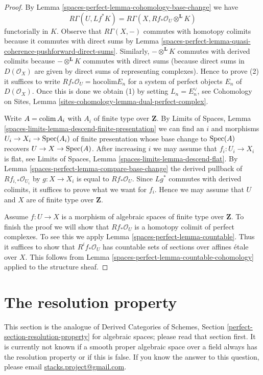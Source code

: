 \begin{proof}
By Lemma \ref{spaces-perfect-lemma-cohomology-base-change} we have
$$
R\Gamma(U, Lf^*K) = R\Gamma(X, Rf_*\mathcal{O}_U \otimes^\mathbf{L} K)
$$
functorially in $K$. Observe that $R\Gamma(X, -)$ commutes with
homotopy colimits because it commutes with direct sums by
Lemma \ref{spaces-perfect-lemma-quasi-coherence-pushforward-direct-sums}.
Similarly, $- \otimes^\mathbf{L} K$ commutes with derived colimits
because $- \otimes^\mathbf{L} K$ commutes with direct sums
(because direct sums in $D(\mathcal{O}_X)$
are given by direct sums of representing complexes).
Hence to prove (2) it suffices to write
$Rf_*\mathcal{O}_U = \text{hocolim} E_n$ for a system of
perfect objects $E_n$ of $D(\mathcal{O}_X)$. Once this is done
we obtain (1) by setting $L_n = E_n^\vee$, see Cohomology on Sites,
Lemma \ref{sites-cohomology-lemma-dual-perfect-complex}.

\medskip\noindent
Write $A = \operatorname{colim} A_i$ with $A_i$ of finite type over $\mathbf{Z}$. By
Limits of Spaces, Lemma \ref{spaces-limits-lemma-descend-finite-presentation}
we can find an $i$ and morphisms $U_i \to X_i \to \operatorname{Spec}(A_i)$
of finite presentation whose base change to $\operatorname{Spec}(A)$ recovers
$U \to X \to \operatorname{Spec}(A)$.
After increasing $i$ we may assume that $f_i : U_i \to X_i$ is
flat, see Limits of Spaces, Lemma
\ref{spaces-limits-lemma-descend-flat}.
By Lemma \ref{spaces-perfect-lemma-compare-base-change}
the derived pullback of $Rf_{i, *}\mathcal{O}_{U_i}$
by $g : X \to X_i$ is equal to $Rf_*\mathcal{O}_U$.
Since $Lg^*$ commutes with derived colimits, it suffices
to prove what we want for $f_i$. Hence we may assume that
$U$ and $X$ are of finite type over $\mathbf{Z}$.

\medskip\noindent
Assume $f : U \to X$ is a morphism of algebraic spaces
of finite type over $\mathbf{Z}$. To finish the proof
we will show that $Rf_*\mathcal{O}_U$ is a homotopy
colimit of perfect complexes. To see this we apply Lemma \ref{spaces-perfect-lemma-countable}.
Thus it suffices to show that $R^if_*\mathcal{O}_U$
has countable sets of sections over affines \'etale over $X$.
This follows from Lemma \ref{spaces-perfect-lemma-countable-cohomology}
applied to the structure sheaf.
\end{proof}

\section{The resolution property}
\label{spaces-perfect-section-resolution-property}
This section is the analogue of Derived Categories of Schemes, Section
\ref{perfect-section-resolution-property} for algebraic spaces; please
read that section first. It is currently not known if a smooth
proper algebraic space over a field always has the resolution property
or if this is false. If you know the answer to this question, please email
\href{mailto:stacks.project@gmail.com}{stacks.project@gmail.com}.

